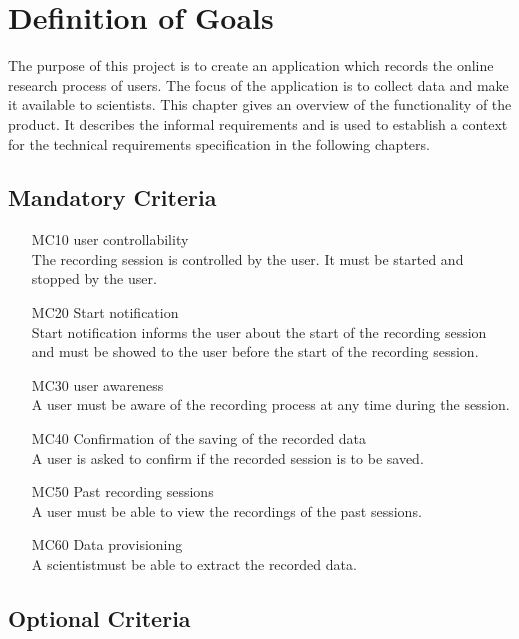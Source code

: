 \chapter{Definition of Goals}
\label{ch:goals}

The purpose of this project is to create an application which records the online research process of \glspl{user}. The focus of the application is to collect data and make it available to \glspl{scientist}. This chapter gives an overview of the functionality of the product. It describes the informal requirements and is used to establish a context for the technical requirements specification in the following chapters.

\section{Mandatory Criteria}

\begin{itemize}

	\item[MC10]\Gls{user} controllability\\The recording \gls{session} is controlled by the \gls{user}. It must be started and stopped by the \gls{user}.
	\item[MC20]Start notification\\Start notification informs the \gls{user} about the start of the recording \gls{session} and must be showed to the user before the start of the recording \gls{session}. 
	\item[MC30]\Gls{user} awareness\\A \gls{user} must be aware of the recording process at any time during the \gls{session}.
	\item[MC40]Confirmation of the saving of the recorded data\\A \gls{user} is asked to confirm if the recorded \gls{session} is to be saved.
	\item[MC50]Past recording \glspl{session}\\A \gls{user} must be able to view the recordings of the past \glspl{session}.
	\item[MC60]Data provisioning\\A \gls{scientist}must be able to extract the recorded data.

\end{itemize}

\section{Optional Criteria}

